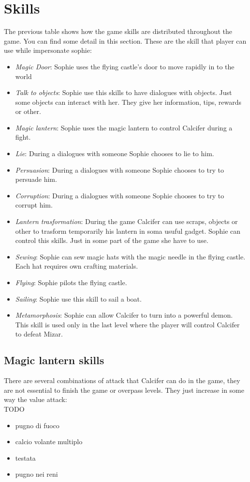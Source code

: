 \section{Skills}
The previous table shows how the game skills are distributed throughout the game. You can find some detail in this section. These are the skill that player can use while impersonate sophie:
\begin{itemize}
\item \textit{Magic Door}: Sophie uses the flying castle's door to move rapidly in to the world
\item \textit{Talk to objects}: Sophie use this skills to have dialogues with objects. Just some objects can interact with her. They give her information, tips, rewards or other.
\item \textit{Magic lantern}: Sophie uses the magic lantern to control Calcifer during a fight.
\item \textit{Lie}: During a dialogues with someone Sophie chooses to lie to him.
\item \textit{Persuasion}: During a dialogues with someone Sophie chooses to try to persuade him.
\item \textit{Corruption}: During a dialogues with someone Sophie chooses to try to corrupt him.
\item \textit{Lantern trasformation}: During the game Calcifer can use scraps, objects or other to trasform temporarily his lantern in soma usuful gadget. Sophie can control this skills. Just in some part of the game she have to use.
\item \textit{Sewing}: Sophie can sew magic hats with the magic needle in the flying castle. Each hat requires own crafting materials.
\item \textit{Flying}: Sophie pilots the flying castle.
\item \textit{Sailing}: Sophie use this skill to sail a boat.
\item \textit{Metamorphosis}: Sophie can allow Calcifer to turn into a powerful demon. This skill is used only in the last level where the player will control Calcifer to defeat Mizar.
\end{itemize}

\subsection{Magic lantern skills}
There are several combinations of attack that Calcifer can do in the game, they are not essential to finish the game or overpass levels. They just increase in some way the value attack:\\
TODO
\begin{itemize}
\item pugno di fuoco
\item calcio volante multiplo
\item testata
\item pugno nei reni
\end{itemize}

